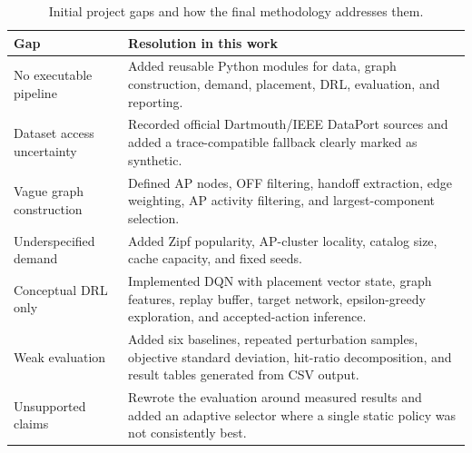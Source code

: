 \begin{table}[t]
\centering
\caption{Initial project gaps and how the final methodology addresses them.}
\label{tab:gap_closure}
\begin{tabular}{p{}p{}}
\toprule
Gap & Resolution in this work \\
\midrule
No executable pipeline & Added reusable Python modules for data, graph construction, demand, placement, DRL, evaluation, and reporting. \\
Dataset access uncertainty & Recorded official Dartmouth/IEEE DataPort sources and added a trace-compatible fallback clearly marked as synthetic. \\
Vague graph construction & Defined AP nodes, OFF filtering, handoff extraction, edge weighting, AP activity filtering, and largest-component selection. \\
Underspecified demand & Added Zipf popularity, AP-cluster locality, catalog size, cache capacity, and fixed seeds. \\
Conceptual DRL only & Implemented DQN with placement vector state, graph features, replay buffer, target network, epsilon-greedy exploration, and accepted-action inference. \\
Weak evaluation & Added six baselines, repeated perturbation samples, objective standard deviation, hit-ratio decomposition, and result tables generated from CSV output. \\
Unsupported claims & Rewrote the evaluation around measured results and added an adaptive selector where a single static policy was not consistently best. \\
\bottomrule
\end{tabular}
\end{table}

